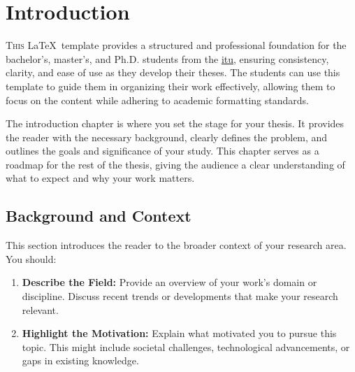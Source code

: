 %
%
%
%
%
%

\chapter{Introduction}\label{chap:introduction}
\lettrine[lines=3]{T}{his} \LaTeX~template provides a structured and professional foundation for the bachelor's, master's, and Ph.D. students from the \href{http://itu.dk}{\acrfull{itu}}, ensuring consistency, clarity, and ease of use as they develop their theses. The students can use this template to guide them in organizing their work effectively, allowing them to focus on the content while adhering to academic formatting standards.

The introduction chapter is where you set the stage for your thesis. It provides the reader with the necessary background, clearly defines the problem, and outlines the goals and significance of your study. This chapter serves as a roadmap for the rest of the thesis, giving the audience a clear understanding of what to expect and why your work matters.

\section{Background and Context}\label{sec:background-context}
This section introduces the reader to the broader context of your research area. You should:
\begin{enumerate}
	\item \textbf{Describe the Field:} Provide an overview of your work's domain or discipline. Discuss recent trends or developments that make your research relevant.
	\item \textbf{Highlight the Motivation:} Explain what motivated you to pursue this topic. This might include societal challenges, technological advancements, or gaps in existing knowledge.
\end{enumerate}

